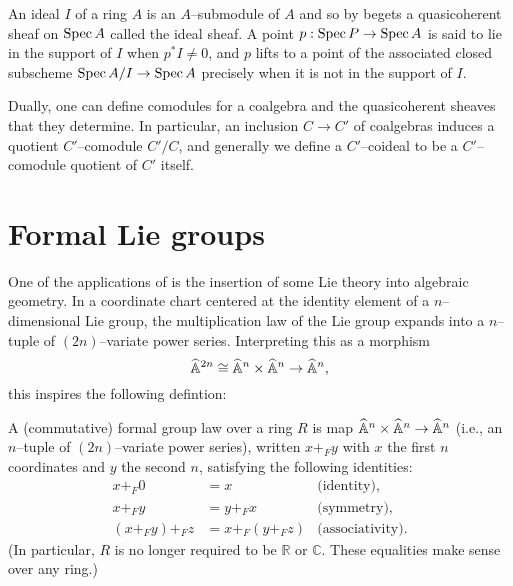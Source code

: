 \begin{example}
An ideal $I$ of a ring $A$ is an $A$--submodule of $A$ and so by  begets a quasicoherent sheaf on $\operatorname{Spec} A$ called the ideal sheaf.  A point $p: \operatorname{Spec} P \to \operatorname{Spec} A$ is said to lie in the support of $I$ when $p^* I \ne 0$, and $p$ lifts to a point of the associated closed subscheme $\operatorname{Spec} A/I \to \operatorname{Spec} A$ precisely when it is not in the support of $I$.
\end{example}

\begin{example}\label{DefnCoideal}
Dually, one can define comodules for a coalgebra and the quasicoherent sheaves that they determine.  In particular, an inclusion $C \to C'$ of coalgebras induces a quotient $C'$--comodule $C' / C$, and generally we define a $C'$--coideal to be a $C'$--comodule quotient of $C'$ itself.
\end{example}





\section*{Formal Lie groups}\label{FormalLieGroups}

One of the applications of  is the insertion of some Lie theory into algebraic geometry.  In a coordinate chart centered at the identity element of a $n$--dimensional Lie group, the multiplication law of the Lie group expands into a $n$--tuple of $(2n)$--variate power series.  Interpreting this as a morphism \[\widehat{\mathbb{A}}^{2n} \cong \widehat{\mathbb{A}}^n \times \widehat{\mathbb{A}}^n \to \widehat{\mathbb{A}}^n,\] this inspires the following defintion:
\begin{definition}\label{DefinitionOfDimension}
A (commutative) formal group law over a ring $R$ is map $\widehat{\mathbb{A}}^n \times \widehat{\mathbb{A}}^n \to \widehat{\mathbb{A}}^n$ (i.e., an $n$--tuple of $(2n)$--variate power series), written $x +_F y$ with $x$ the first $n$ coordinates and $y$ the second $n$, satisfying the following identities:
\begin{align*}
x +_F 0 & = x & \text{(identity)}, \\
x +_F y & = y +_F x & \text{(symmetry)}, \\
(x +_F y) +_F z & = x +_F (y +_F z) & \text{(associativity)}.
\end{align*}
(In particular, $R$ is no longer required to be $\mathbb{R}$ or $\mathbb C$. These equalities make sense over any ring.)
\end{definition}


